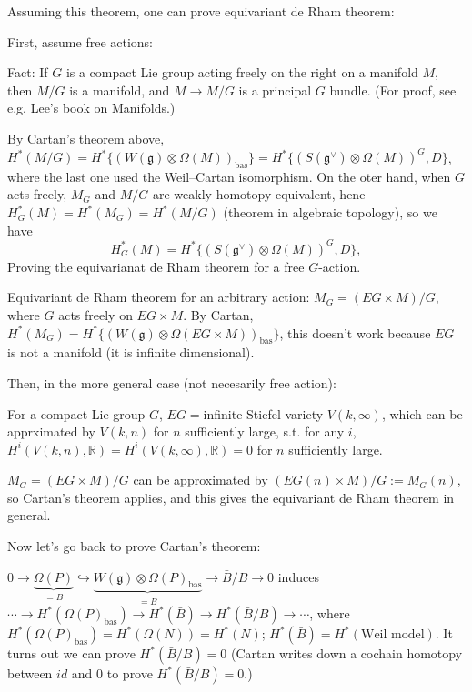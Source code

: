 \documentclass{article}
\theoremstyle{mystyle}
\theoremstyle{remark}
\numberwithin{equation}{section}
\begin{document}
Assuming this theorem, one can prove equivariant de Rham theorem:

First, assume free actions: 

Fact: If $G$ is a compact Lie group acting freely on the right on a manifold $M$, then $M/G$ is a manifold, and $M\rightarrow M/G$ is a principal $G$ bundle. (For proof, see e.g. Lee's book on Manifolds.)


By Cartan's theorem above, $H^*(M/G) = 
H^*\{(W(\mathfrak{g})\otimes \Omega(M))_{\text{bas}}\}
= H^*\{(S(\mathfrak{g}^\vee)\otimes \Omega(M))^G,D\}$, where the last one used the Weil--Cartan isomorphism. On the oter hand, when $G$ acts freely, $M_G$ and $M/G$ are weakly homotopy equivalent, hene 
$H^*_G(M) = H^*(M_G) = H^*(M/G)$ (theorem in algebraic topology), so we have
$$H^*_G(M) = H^*\{(S(\mathfrak{g}^\vee)\otimes \Omega(M))^G,D\},$$
Proving the equivarianat de Rham theorem for a free $G$-action.

Equivariant de Rham theorem for an arbitrary action: $M_G  = (EG\times M)/G$, where $G$ acts freely on $EG\times M$. By Cartan,
$H^*(M_G) = H^*\{(W(\mathfrak{g})\otimes \Omega(EG\times M))_{\text{bas}}\}$, this doesn't work because $EG$ is not a manifold (it is infinite dimensional).


Then, in the more general case (not necesarily free action):

For a compact Lie group $G$, $EG = $infinite Stiefel variety $V(k,\infty)$, which can be apprximated by $V(k,n)$ for $n$ sufficiently large, s.t. for any $i$, $H^i(V(k,n),\mathbb{R}) = H^i(V(k,\infty),\mathbb{R}) = 0$ for $n$ sufficiently large. 

$M_G = (EG\times M)/G$ can be approximated by $(EG(n)\times M)/G:= M_G(n)$, so Cartan's theorem applies, and this gives the equivariant de Rham theorem in general.

Now let's go back to prove Cartan's theorem:

$0\rightarrow \underbrace{\Omega(P)}_{=B} \hookrightarrow \underbrace{W(\mathfrak{g})\otimes \Omega(P)_{\text{bas}}}_{=\bar{B}}\rightarrow \bar{B}/B\rightarrow 0$
induces
$\cdots \rightarrow H^*(\Omega(P)_{\text{bas}}) \rightarrow H^*(\bar{B}) \rightarrow H^*(\bar{B}/B)\rightarrow \cdots$,
where $H^*(\Omega(P)_{\text{bas}}) = H^*(\Omega(N)) = H^*(N)$; $H^*(\bar{B}) = H^*(\text{Weil model})$. It turns out we can prove $H^*(\bar{B}/B)=0$ (Cartan writes down a cochain homotopy between $id$ and $0$ to prove $H^*(\bar{B}/B)=0$.)
\end{document}
